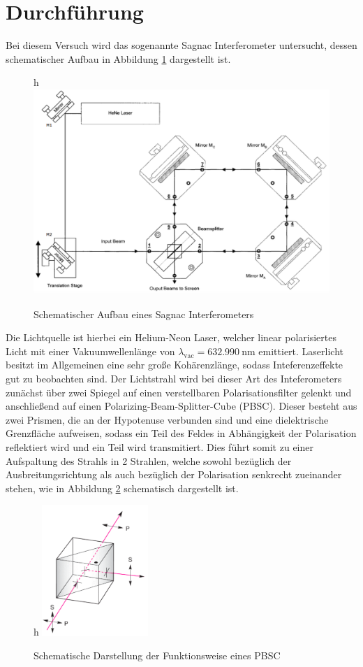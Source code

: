 \section{Durchführung}
\label{sec:Durchführung}

Bei diesem Versuch wird das sogenannte Sagnac Interferometer untersucht, dessen
schematischer Aufbau in Abbildung \ref{fig:aufbau} dargestellt ist.
\begin{figure}{h}
  \centering
  \includegraphics[width=14cm]{aufbau.png}
  \caption{Schematischer Aufbau eines Sagnac Interferometers \cite{skript}}
  \label{fig:aufbau}
\end{figure}
Die Lichtquelle ist hierbei ein Helium-Neon Laser, welcher linear polarisiertes Licht
mit einer Vakuumwellenlänge von
$\lambda_{\text{vac}}=\SI{632.990}{\nano\metre}$ emittiert.
Laserlicht besitzt im Allgemeinen eine sehr große Kohärenzlänge, sodass Inteferenzeffekte gut zu beobachten sind.
Der Lichtstrahl wird bei dieser Art des Inteferometers zunächst über zwei Spiegel auf einen
verstellbaren Polarisationsfilter gelenkt und anschließend auf einen Polarizing-Beam-Splitter-Cube (PBSC).
Dieser besteht aus zwei Prismen, die an der Hypotenuse verbunden sind und eine dielektrische Grenzfläche
aufweisen, sodass ein Teil des Feldes in Abhängigkeit der Polarisation reflektiert wird
und ein Teil wird transmitiert. Dies führt somit zu einer Aufspaltung des Strahls
in 2 Strahlen, welche sowohl bezüglich der Ausbreitungsrichtung als auch
bezüglich der Polarisation senkrecht zueinander stehen, wie in Abbildung \ref{fig:PBSC}
schematisch dargestellt ist.\\
\begin{figure}{h}
  \centering
  \includegraphics[width=4cm]{PBSC.png}
  \caption{Schematische Darstellung der Funktionsweise eines PBSC \cite{online1}}
  \label{fig:PBSC}
\end{figure}
